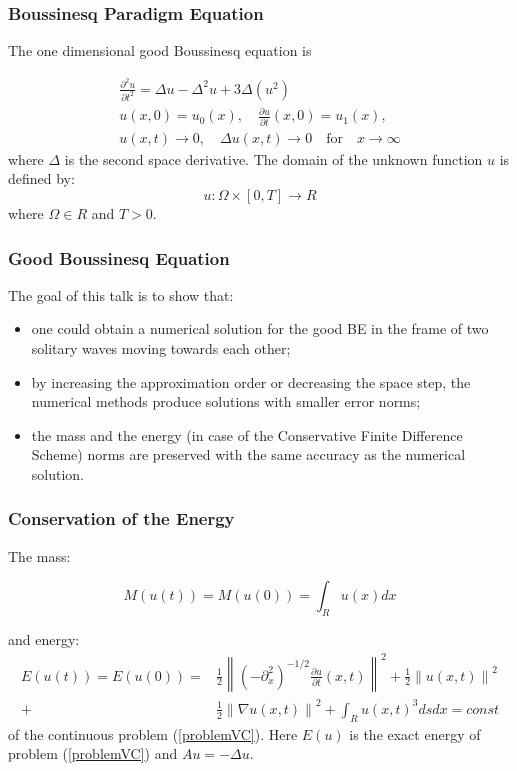 \documentclass{beamer}
\newcommand{\be}{\begin{equation}}
\newcommand{\ee}{\end{equation}}
\newcommand{\rf}[1]{(\ref{#1})}
\begin{document}
\begin{frame}
\frametitle{Boussinesq Paradigm Equation}


The one dimensional good Boussinesq equation is

\begin{align}\label{problem}
 \frac{\partial^2 u}{\partial t^2}= \Delta u -  \Delta^2 u +  3 \Delta (u^2)
\\
u(x,0) = u_0(x), \quad \frac{\partial u}{\partial t}(x,0)=u_1(x), \nonumber
\\
u(x,t) \rightarrow 0, \quad \Delta u(x, t) \rightarrow 0 \quad \text{for} \quad x \rightarrow \infty \nonumber
\end{align}
where $\Delta$ is the second space derivative. The domain of the unknown function $u$ is defined by:
\be
 u:\Omega \times [0, T] \rightarrow R
\ee
where $\Omega \in R$ and $T>0$.
\end{frame}



\begin{frame}
\frametitle{Good Boussinesq Equation}
The goal of this talk is to show that:
\begin{itemize}
 \item one could obtain a numerical solution for the good BE in the frame of two solitary waves moving towards each other;
 \item by increasing the approximation order or decreasing the space step, the numerical methods produce  solutions with smaller error norms;
 \item the mass and the energy (in case of the Conservative Finite Difference Scheme) norms are preserved with the same accuracy as the numerical solution.
\end{itemize}

\end{frame}


\begin{frame}
\frametitle{Conservation of the Energy}
The mass:

\begin{equation}\label{int}
M(u(t))=M(u(0))=\int_{R} u(x)dx 
\end{equation}

and energy:
\begin{align}\label{ex-en}
E(u(t)) = E(u(0)) =&\frac{1}{2} \left\|(-\partial^2_x)^{-1/2} \frac{\partial u}{\partial t}(x,t)\right\|^2 + \frac{1}{2}  \left\|u (x,t)\right\|^2 
 \nonumber\\
+& \frac{1}{2}\left\| \nabla u(x,t) \right\|^2+ \int _{R} u(x,t)^3 ds dx = const
\end{align}
of the continuous problem \rf{problemVC}. Here $E(u)$ is the exact energy of problem \rf{problemVC} and $Au=-\Delta u$.
\end{frame}
\end{document}
